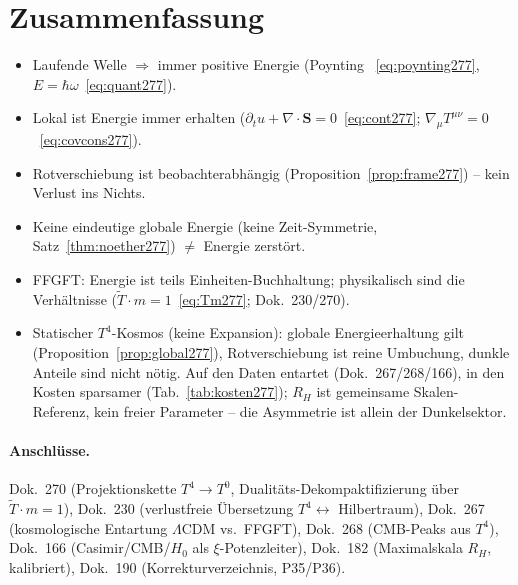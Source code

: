 \section{Zusammenfassung}

\begin{itemize}
  \item Laufende Welle $\Rightarrow$ immer positive Energie (Poynting~%
        \eqref{eq:poynting277}, $E=\hbar\omega$~\eqref{eq:quant277}).
  \item Lokal ist Energie immer erhalten ($\partial_t u+\nabla\!\cdot\mathbf S
        =0$~\eqref{eq:cont277}; $\nabla_\mu T^{\mu\nu}=0$~\eqref{eq:covcons277}).
  \item Rotverschiebung ist beobachterabhängig
        (Proposition~\ref{prop:frame277}) -- kein Verlust ins Nichts.
  \item Keine eindeutige globale Energie (keine Zeit-Symmetrie,
        Satz~\ref{thm:noether277}) $\neq$ Energie zerstört.
  \item FFGFT: Energie ist teils Einheiten-Buchhaltung; physikalisch sind die
        Verhältnisse ($\tilde T\cdot m = 1$~\eqref{eq:Tm277};
        Dok.~230/270).
  \item Statischer $T^4$-Kosmos (keine Expansion): globale Energieerhaltung gilt
        (Proposition~\ref{prop:global277}), Rotverschiebung ist reine Umbuchung,
        dunkle Anteile sind nicht nötig. Auf den Daten entartet
        (Dok.~267/268/166), in den Kosten sparsamer (Tab.~\ref{tab:kosten277});
        $R_H$ ist gemeinsame Skalen-Referenz, kein freier Parameter -- die
        Asymmetrie ist allein der Dunkelsektor.
\end{itemize}

\paragraph{Anschlüsse.}
Dok.~270 (Projektionskette $T^4\to T^0$, Dualitäts-Dekompaktifizierung über
$\tilde T\cdot m=1$), Dok.~230 (verlustfreie Übersetzung $T^4\leftrightarrow$
Hilbertraum), Dok.~267 (kosmologische Entartung $\Lambda$CDM vs.\ FFGFT),
Dok.~268 (CMB-Peaks aus $T^4$), Dok.~166 (Casimir/CMB/$H_0$ als
$\xi$-Potenzleiter), Dok.~182 (Maximalskala $R_H$, kalibriert), Dok.~190
(Korrekturverzeichnis, P35/P36).

